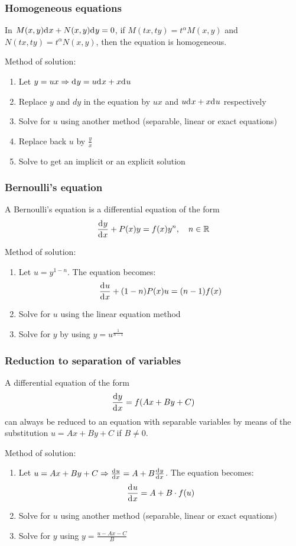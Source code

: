 \documentclass[10pt, twocolumn]{article}
\theoremstyle{definition}
\begin{document}
\subsubsection*{Homogeneous equations}
In \(M(x,y)\mathrm{d}^{} x + N(x,y)\mathrm{d}^{} y = 0\), if \(M(tx,ty) = t^{\alpha}M(x,y)\) and \(N(tx,ty) = t^{\alpha}N(x,y)\), then the equation is homogeneous.

Method of solution:
\begin{enumerate}
  \item Let \(y = ux \Rightarrow \mathrm{d}^{} y = u\mathrm{d}^{} x + x\mathrm{d}^{} u\)
  \item Replace \(y\) and \(dy\) in the equation by \(ux\) and \(u\mathrm{d}^{} x + x\mathrm{d}^{} u\) respectively
  \item Solve for \(u\) using another method (separable, linear or exact equations)
  \item Replace back \(u\) by \(\frac{y}{x}\)
  \item Solve to get an implicit or an explicit solution
\end{enumerate}


\subsubsection*{Bernoulli's equation}
A Bernoulli's equation is a differential equation of the form
\[
  \frac{\mathrm{d}^{} y}{\mathrm{d}^{} x} + P(x)y = f(x)y^n , \quad n \in \mathbb{R}
\]

Method of solution:
\begin{enumerate}
  \item Let \(u = y^{1 - n}\).
        The equation becomes:
        \[
          \frac{\mathrm{d}^{} u}{\mathrm{d}^{} x} + (1 - n)P(x)u = (n - 1)f(x)
        \]
  \item Solve for \(u\) using the linear equation method
  \item Solve for \(y\) by using \(y = u^{\frac{1}{n - 1}}\)
\end{enumerate}


\subsubsection*{Reduction to separation of variables}
A differential equation of the form
\[
  \frac{\mathrm{d}^{} y}{\mathrm{d}^{} x} = f(Ax + By + C)
\]
can always be reduced to an equation with separable variables by means of the substitution \(u = Ax + By + C\) if \(B \neq 0\).

Method of solution:
\begin{enumerate}
  \item Let \(u = Ax + By + C \Rightarrow \frac{\mathrm{d}^{} u}{\mathrm{d}^{} x} = A + B \frac{\mathrm{d}^{} y}{\mathrm{d}^{} x}\).
        The equation becomes:
        \[
          \frac{\mathrm{d}^{} u}{\mathrm{d}^{} x} = A + B \cdot f(u)
        \]
  \item Solve for \(u\) using another method (separable, linear or exact equations)
  \item Solve for \(y\) using \(y = \frac{u - Ax - C}{B}\)
\end{enumerate}
\end{document}
